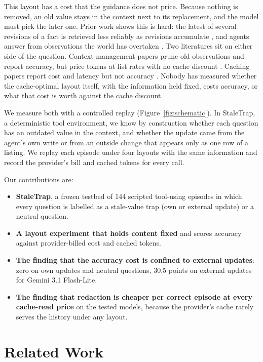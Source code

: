 This layout has a cost that the guidance does not price. Because nothing is removed, an old value stays in the context next to its replacement, and the model must pick the later one. Prior work shows this is hard: the latest of several revisions of a fact is retrieved less reliably as revisions accumulate \citep{a2603_12271,a2510_22752}, and agents answer from observations the world has overtaken \citep{a2610_05281}. Two literatures sit on either side of the question. Context-management papers prune old observations and report accuracy, but price tokens at list rates with no cache discount \citep{a2606_10209,a2508_21433,a2605_18854}. Caching papers report cost and latency but not accuracy \citep{a2601_06007,a2607_15516}. Nobody has measured whether the cache-optimal layout itself, with the information held fixed, costs accuracy, or what that cost is worth against the cache discount.

We measure both with a controlled replay (Figure~\ref{fig:schematic}). In StaleTrap, a deterministic tool environment, we know by construction whether each question has an outdated value in the context, and whether the update came from the agent's own write or from an outside change that appears only as one row of a listing. We replay each episode under four layouts with the same information and record the provider's bill and cached tokens for every call.

Our contributions are:
\begin{itemize}
\item \textbf{StaleTrap}, a frozen testbed of 144 scripted tool-using episodes in which every question is labelled as a stale-value trap (own or external update) or a neutral question.
\item \textbf{A layout experiment that holds content fixed} and scores accuracy against provider-billed cost and cached tokens.
\item \textbf{The finding that the accuracy cost is confined to external updates}: zero on own updates and neutral questions, 30.5 points on external updates for Gemini 3.1 Flash-Lite.
\item \textbf{The finding that redaction is cheaper per correct episode at every cache-read price} on the tested models, because the provider's cache rarely serves the history under any layout.
\end{itemize}

\section{Related Work}
\label{sec:related}

